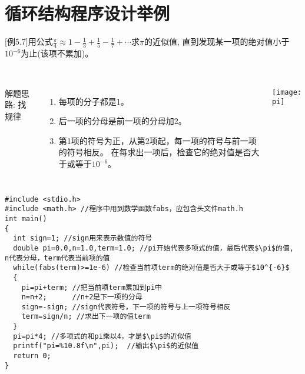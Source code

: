 
\section{循环结构程序设计举例}

\begin{frame}
$[$例5.7$]$用公式$\frac{\pi}{4}\approx 1-\frac{1}{3}+\frac{1}{5}-\frac{1}{7}+\cdots$求$\pi$的近似值, 直到发现某一项的绝对值小于$10^{-6}$为止(该项不累加)。\\
~\\
\begin{columns}
解题思路:  找规律
\begin{enumerate}
	\item 每项的分子都是1。
	\item 后一项的分母是前一项的分母加2。
	\item 第1项的符号为正，从第2项起，每一项的符号与前一项的符号相反。
	在每求出一项后，检查它的绝对值是否大于或等于$10^{-6}$。
\end{enumerate}
\texttt{[image: pi]}
\end{columns}
\end{frame}

\begin{frame}
\begin{lstlisting}
#include <stdio.h>
#include <math.h> //程序中用到数学函数fabs，应包含头文件math.h
int main()
{
  int sign=1; //sign用来表示数值的符号
  double pi=0.0,n=1.0,term=1.0; //pi开始代表多项式的值，最后代表$\pi$的值, n代表分母，term代表当前项的值
  while(fabs(term)>=1e-6) //检查当前项term的绝对值是否大于或等于$10^{-6}$
  {
    pi=pi+term; //把当前项term累加到pi中
    n=n+2;      //n+2是下一项的分母 
    sign=-sign; //sign代表符号，下一项的符号与上一项符号相反
    term=sign/n; //求出下一项的值term
  }
  pi=pi*4; //多项式的和pi乘以4，才是$\pi$的近似值
  printf("pi=%10.8f\n",pi);  //输出$\pi$的近似值  
  return 0;
}
\end{lstlisting}
\end{frame}

